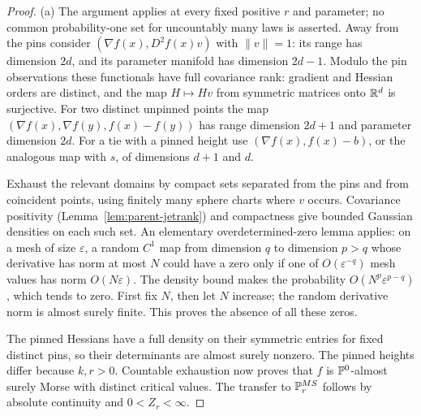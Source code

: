\begin{proof}
(a) The argument applies at every fixed positive $r$ and parameter; no common probability-one set for uncountably many laws is asserted. Away from the pins consider $(\nabla f(x),D^2f(x)v)$ with $\|v\|=1$: its range has dimension $2d$, and its parameter manifold has dimension $2d-1$. Modulo the pin observations these functionals have full covariance rank: gradient and Hessian orders are distinct, and the map $H\mapsto Hv$ from symmetric matrices onto $\mathbb R^d$ is surjective. For two distinct unpinned points the map $(\nabla f(x),\nabla f(y),f(x)-f(y))$ has range dimension $2d+1$ and parameter dimension $2d$. For a tie with a pinned height use $(\nabla f(x),f(x)-b)$, or the analogous map with $s$, of dimensions $d+1$ and $d$.

Exhaust the relevant domains by compact sets separated from the pins and from coincident points, using finitely many sphere charts where $v$ occurs. Covariance positivity (Lemma~\ref{lem:parent-jetrank}) and compactness give bounded Gaussian densities on each such set. An elementary overdetermined-zero lemma applies: on a mesh of size $\varepsilon$, a random $C^1$ map from dimension $q$ to dimension $p>q$ whose derivative has norm at most $N$ could have a zero only if one of $O(\varepsilon^{-q})$ mesh values has norm $O(N\varepsilon)$. The density bound makes the probability $O(N^p\varepsilon^{p-q})$, which tends to zero. First fix $N$, then let $N$ increase; the random derivative norm is almost surely finite. This proves the absence of all these zeros.

The pinned Hessians have a full density on their symmetric entries for fixed distinct pins, so their determinants are almost surely nonzero. The pinned heights differ because $k,r>0$. Countable exhaustion now proves that $f$ is $\mathbb P^0$-almost surely Morse with distinct critical values. The transfer to $\mathbb P^{MS}_r$ follows by absolute continuity and $0<Z_r<\infty$.


\end{proof}
